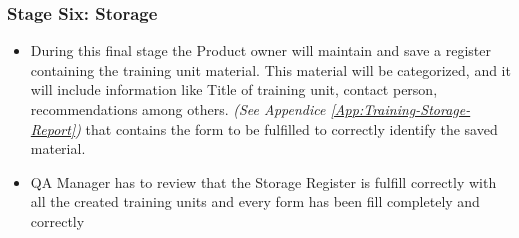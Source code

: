 \documentclass{template/openetcs_article}
\begin{document}
\subsubsection{Stage Six: Storage}
\begin{itemize}
\item During this final stage the Product owner will maintain and save a register containing the training unit material. This material will be categorized, and it will include information like Title of training unit, contact person, recommendations among others. {\it {(See Appendice \ref{App:Training-Storage-Report})}} that contains the form to be fulfilled to correctly identify the saved material.
\item QA Manager has to review that the Storage Register is fulfill correctly with all the created training units and every form has been fill completely and correctly
\end{itemize}
\end{document}
